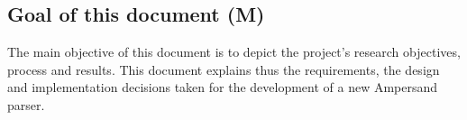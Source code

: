 
\subsection{Goal of this document (M)}
The main objective of this document is to depict the project's research objectives, process and results.
This document explains thus the requirements, the design and implementation decisions taken for the development of a new Ampersand parser.
